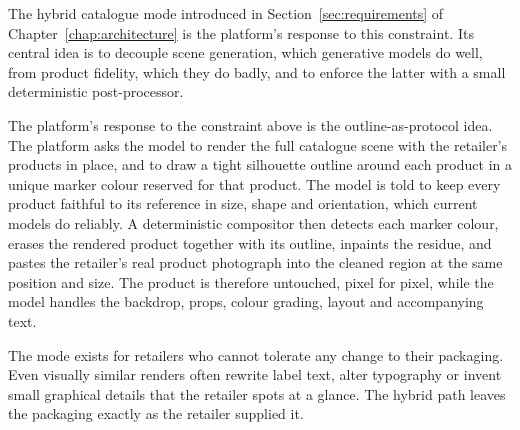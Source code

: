 The hybrid catalogue mode introduced in Section~\ref{sec:requirements} of Chapter~\ref{chap:architecture} is the platform's response to this constraint. Its central idea is to decouple scene generation, which generative models do well, from product fidelity, which they do badly, and to enforce the latter with a small deterministic post-processor.

\label{subsec:hyb-protocol}
The platform's response to the constraint above is the outline-as-protocol idea. The platform asks the model to render the full catalogue scene with the retailer's products in place, and to draw a tight silhouette outline around each product in a unique marker colour reserved for that product. The model is told to keep every product faithful to its reference in size, shape and orientation, which current models do reliably. A deterministic compositor then detects each marker colour, erases the rendered product together with its outline, inpaints the residue, and pastes the retailer's real product photograph into the cleaned region at the same position and size. The product is therefore untouched, pixel for pixel, while the model handles the backdrop, props, colour grading, layout and accompanying text.

The mode exists for retailers who cannot tolerate any change to their packaging. Even visually similar renders often rewrite label text, alter typography or invent small graphical details that the retailer spots at a glance. The hybrid path leaves the packaging exactly as the retailer supplied it.

